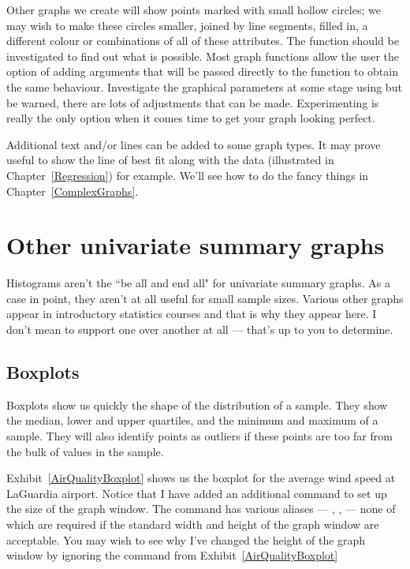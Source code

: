  Other graphs we create will show points marked with small hollow circles; we may wish to make these circles smaller, joined by line segments, filled in, a different colour or combinations of all of these attributes. The  function should be investigated to find out what is possible. Most graph functions allow the user the option of adding arguments that will be passed directly to the  function to obtain the same behaviour. Investigate the graphical parameters at some stage using  but be warned, there are lots of adjustments that can be made. Experimenting is really the only option when it comes time to get your graph looking perfect. 
 
Additional text and/or lines can be added to some graph types. It may prove useful to show the line of best fit along with the data (illustrated in Chapter~\ref{Regression}) for example. We'll see how to do the fancy things in Chapter~\ref{ComplexGraphs}. 
 
\section{Other univariate summary graphs} 
 
Histograms aren't the ``be all and end all" for univariate summary graphs. As a case in point, they aren't at all useful for small sample sizes. Various other graphs appear in introductory statistics courses and that is why they appear here. I don't mean to support one over another at all --- that's up to you to determine. 
 
\subsection{Boxplots} 
 
Boxplots show us quickly the shape of the distribution of a sample. They show the median, lower and upper quartiles, and the minimum and maximum of a sample. They will also identify points as outliers if these points are too far from the bulk of values in the sample. 
 
Exhibit~\ref{AirQualityBoxplot} shows us the boxplot for the average wind speed at LaGuardia airport. Notice that I have added an additional command to set up the size of the graph window. The  command has various aliases --- , ,  --- none of which are required if the standard width and height of the graph window are acceptable. You may wish to see why I've changed the height of the graph window by ignoring the  command from Exhibit~\ref{AirQualityBoxplot} 
 
